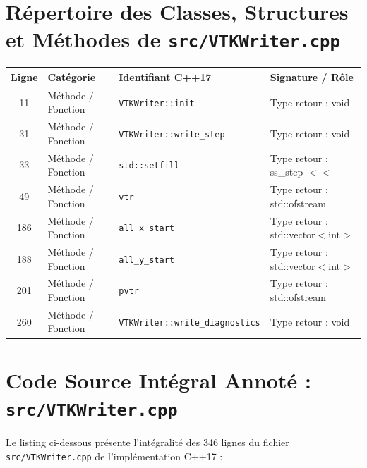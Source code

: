 \documentclass[10pt,a4paper,oneside]{book}
\begin{document}
\section{Répertoire des Classes, Structures et Méthodes de \texttt{src/VTKWriter.cpp}}
\begin{center}\small
\begin{tabular}{clll}
\toprule
\textbf{Ligne} & \textbf{Catégorie} & \textbf{Identifiant C++17} & \textbf{Signature / Rôle} \\
\midrule
11 & Méthode / Fonction & \texttt{VTKWriter::init} & Type retour : void \\
31 & Méthode / Fonction & \texttt{VTKWriter::write\_step} & Type retour : void \\
33 & Méthode / Fonction & \texttt{std::setfill} & Type retour : ss\_step $<$$<$ \\
49 & Méthode / Fonction & \texttt{vtr} & Type retour : std::ofstream \\
186 & Méthode / Fonction & \texttt{all\_x\_start} & Type retour : std::vector$<$int$>$ \\
188 & Méthode / Fonction & \texttt{all\_y\_start} & Type retour : std::vector$<$int$>$ \\
201 & Méthode / Fonction & \texttt{pvtr} & Type retour : std::ofstream \\
260 & Méthode / Fonction & \texttt{VTKWriter::write\_diagnostics} & Type retour : void \\
\bottomrule
\end{tabular}
\end{center}

\section{Code Source Intégral Annoté : \texttt{src/VTKWriter.cpp}}
Le listing ci-dessous présente l'intégralité des 346 lignes du fichier \texttt{src/VTKWriter.cpp} de l'implémentation C++17 :
\end{document}
